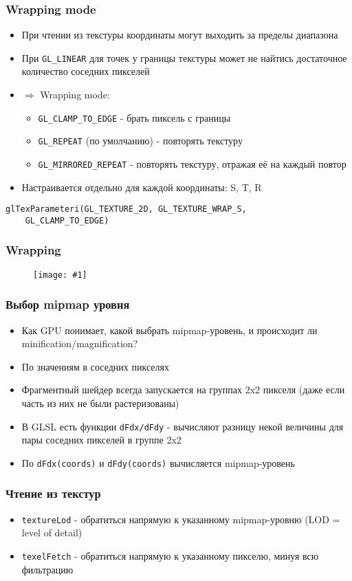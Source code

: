 \documentclass{beamer}
\newcommand{\slideimage}[1]{
  \begin{figure}
    \begin{adjustbox}{width=\textwidth, totalheight=\textheight-2\baselineskip-2\baselineskip,keepaspectratio}
      \texttt{[image: \#1]}
    \end{adjustbox}
  \end{figure}
}
\begin{document}
\begin{frame}[fragile]
\frametitle{Wrapping mode}
\begin{itemize}
\item При чтении из текстуры координаты могут выходить за пределы диапазона
\pause
\item При \verb|GL_LINEAR| для точек у границы текстуры может не найтись достаточное количество соседних пикселей
\pause
\item \begin{math}\Rightarrow\end{math} Wrapping mode:
\begin{itemize}
\item \verb|GL_CLAMP_TO_EDGE| - брать пиксель с границы
\item \verb|GL_REPEAT| (по умолчанию) - повторять текстуру
\item \verb|GL_MIRRORED_REPEAT| - повторять текстуру, отражая её на каждый повтор
\end{itemize}
\pause
\item Настраивается отдельно для каждой координаты: S, T, R
\end{itemize}
\begin{verbatim}
glTexParameteri(GL_TEXTURE_2D, GL_TEXTURE_WRAP_S,
    GL_CLAMP_TO_EDGE)
\end{verbatim}
\end{frame}

\begin{frame}
\frametitle{Wrapping}
\slideimage{wrapping.png}
\end{frame}

\begin{frame}[fragile]
\frametitle{Выбор mipmap уровня}
\begin{itemize}
\item Как GPU понимает, какой выбрать mipmap-уровень, и происходит ли minification/magnification?
\pause
\item По значениям в соседних пикселях
\pause
\item Фрагментный шейдер всегда запускается на группах 2x2 пикселя (даже если часть из них не были растеризованы)
\pause
\item В GLSL есть функции \verb|dFdx/dFdy| - вычисляют разницу некой величины для пары соседних пикселей в группе 2x2
\pause
\item По \verb|dFdx(coords)| и \verb|dFdy(coords)| вычисляется mipmap-уровень
\end{itemize}
\end{frame}

\begin{frame}[fragile]
\frametitle{Чтение из текстур}
\begin{itemize}
\item \verb|textureLod| - обратиться напрямую к указанному mipmap-уровню (LOD = level of detail)
\pause
\item \verb|texelFetch| - обратиться напрямую к указанному пикселю, минуя всю фильтрацию
\end{itemize}
\end{frame}
\end{document}
